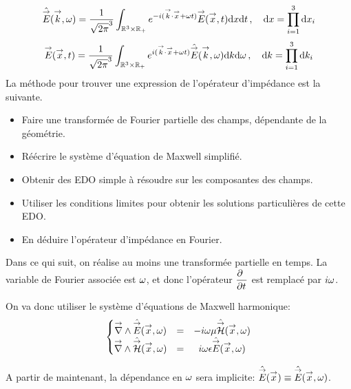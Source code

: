 \begin{equation}
    \hat{\vE} (\vect{k},\w) = \frac{1}{\sqrt{2\pi}^3}\int_{\RR^3\times\RR_+} e^{-i(\vect{k} \cdot \vect{x}+\w t)}\vE(\vect{x},t) \dd{x}\dd{t}\,, \quad \dd x = \prod\limits_{i=1}^3 \dd{x}_i
\end{equation}
\begin{equation}
    \vE(\vect{x},t) = \frac{1}{\sqrt{2\pi}^3}\int_{\RR^3\times\RR_+} e^{i(\vect{k} \cdot \vect{x}+\w t)}\hat{\vE} (\vect{k},\w) \dd{k} \dd{\w}\,, \quad \dd k = \prod\limits_{i=1}^3 \dd{k}_i
\end{equation}
La méthode pour trouver une expression de l'opérateur d'impédance est la suivante.
\begin{itemize}
\item Faire une transformée de Fourier partielle des champs, dépendante de la géométrie.
\item Réécrire le système d'équation de Maxwell simplifié.
\item Obtenir des EDO simple à résoudre sur les composantes des champs.
\item Utiliser les conditions limites pour obtenir les solutions particulières de cette EDO.
\item En déduire l'opérateur d'impédance en Fourier.
\end{itemize}

Dans ce qui suit, on réalise au moins une transformée partielle en temps. La variable de Fourier associée est \(\w\), et donc l'opérateur \(\ddr{t}{~}\) est remplacé par \(i\w\).


On va donc utiliser le système d'équations de Maxwell harmonique:
\begin{equation}
    \left\lbrace
    \begin{matrix}
    \vrot \hat \vE(\vx,\w)  &=& -i \omega \mu \hat \vH(\vx,\w)  \\
    \vrot \hat \vH(\vx,\w)  &=& i \omega \eps \hat \vE(\vx,\w)
    \end{matrix}
    \right.
    \label{eq:imp_fourier:intro:maxwell_harmonique}
\end{equation}

A partir de maintenant, la dépendance en \(\w\) sera implicite: \(\hat \vE(\vx) \equiv \hat \vE (\vx, \w)\).